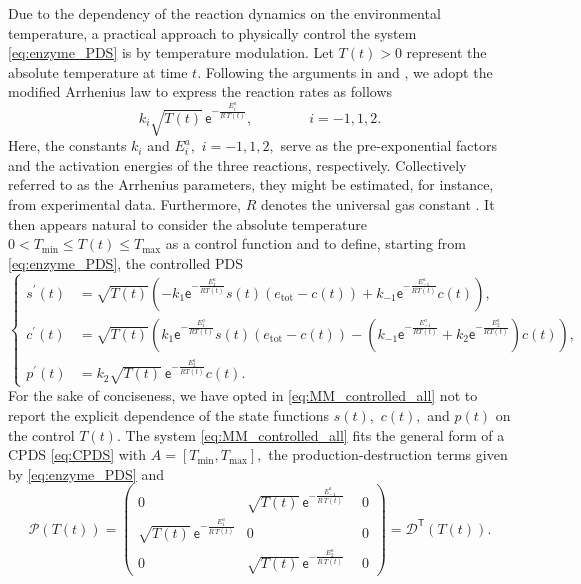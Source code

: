\documentclass[10pt]{article}
\theoremstyle{remark}
\newcommand{\tpose}{^\mathsf{T}}
\theoremstyle{definition}
\theoremstyle{remark}
\begin{document}
Due to the dependency of the reaction dynamics on the environmental temperature, a practical approach to physically control the system \eqref{eq:enzyme_PDS} is by temperature modulation. Let $T(t)>0$ represent the absolute temperature at time $t.$ Following the arguments in \cite[Section 10.9]{Atkins-DePaula} and \cite[Page 174]{Laidler}, we adopt the modified Arrhenius law  to express the reaction rates as follows
\begin{equation}\label{eq:Arrhenius}
    k_i \sqrt{T(t)} \, \mathsf{e}^{-\frac{E^a_i}{R\, T(t)}}, \qquad \qquad i=-1,1,2.
\end{equation}
Here, the constants $k_i$ and $E_i^a,$ $i=-1,1,2,$ serve as the pre-exponential factors and the activation energies  \cite{Laidler} of the three reactions, respectively. Collectively referred to as the Arrhenius parameters, they might be estimated, for instance, from experimental data. Furthermore, $R$ denotes the universal gas constant \cite[Table 1.1]{Atkins-DePaula}. It then appears natural to consider the absolute temperature $0<T_{\min}\leq T(t)\leq T_{\max}$ as a control function and to define, starting from \eqref{eq:enzyme_PDS}, the controlled PDS 
\begin{equation}\label{eq:MM_controlled_all}
    \left\{
     \begin{aligned}
        s^{\prime}(t) &= \sqrt{T(t)} \left(- k_1  \mathsf{e}^{-\frac{E^a_1}{R T(t)}} s(t) (e_{\text{tot}} - c(t)) + k_{-1}  \mathsf{e}^{-\frac{E^a_{-1}}{R T(t)}} c(t)\right), \\
        c^{\prime}(t) &= \sqrt{T(t)} \left( k_1 \mathsf{e}^{-\frac{E^a_1}{R T(t)}} s(t) (e_{\text{tot}} - c(t)) - \left( k_{-1} \mathsf{e}^{-\frac{E^a_{-1}}{R T(t)}} + k_2 \mathsf{e}^{-\frac{E^a_2}{R T(t)}} \right) c(t)\right), \\
        p^{\prime}(t) &= k_2 \sqrt{T(t)} \ \mathsf{e}^{-\frac{E^a_2}{R T(t)}} c(t).
    \end{aligned}
    \right.
\end{equation}
For the sake of conciseness, we have opted in \eqref{eq:MM_controlled_all} not to report the explicit dependence of the state functions $s(t),$ $c(t),$ and $p(t)$ on the control $T(t).$
The system \eqref{eq:MM_controlled_all} fits the general form of a CPDS \eqref{eq:CPDS} with $A=[T_{\min}, T_{\max}],$ the production-destruction terms given by \eqref{eq:enzyme_PDS} and 
\begin{equation*}%
     \mathcal{P}(T(t))=\begin{pmatrix}
        0 & \sqrt{T(t)} \ \mathsf{e}^{-\frac{E^a_{-1}}{R\, T(t)}}\phantom{z} & 0 \\
        \sqrt{T(t)} \ \mathsf{e}^{-\frac{E^a_{1}}{R\, T(t)}} & 0\phantom{z} & 0 \\
          0 & \sqrt{T(t)} \ \mathsf{e}^{-\frac{E^a_{2}}{R\, T(t)}} \phantom{z} & 0 
    \end{pmatrix}=\mathcal{D}\tpose(T(t)).
\end{equation*}
\end{document}
